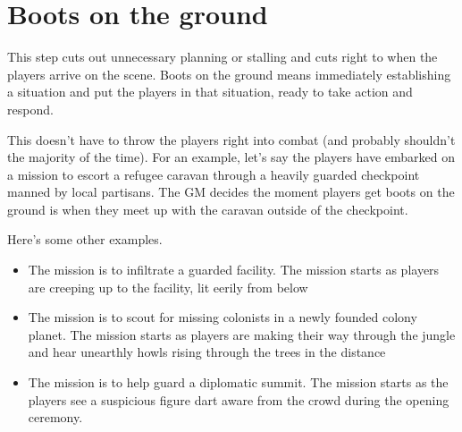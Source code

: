 \section{Boots on the ground}

This step cuts out unnecessary planning or stalling and cuts right to when the players arrive on the scene. Boots on the ground means immediately establishing a situation and put the players in that situation, ready to take action and respond. 

This doesn't have to throw the players right into combat (and probably shouldn't the majority of the time). For an example, let's say the players have embarked on a mission to escort a refugee caravan through a heavily guarded checkpoint manned by local partisans. The GM decides the moment players get boots on the ground is when they meet up with the caravan outside of the checkpoint. 

Here's some other examples.
\begin{itemize}
\item The mission is to infiltrate a guarded facility. The mission starts as players are creeping up to the facility, lit eerily from below
\item The mission is to scout for missing colonists in a newly founded colony planet. The mission starts as players are making their way through the jungle and hear unearthly howls rising through the trees in the distance
\item The mission is to help guard a diplomatic summit. The mission starts as the players see a suspicious figure dart aware from the crowd during the opening ceremony.
\end{itemize}  